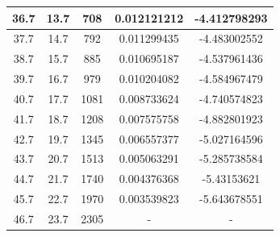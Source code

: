 \documentclass[12pt]{article}
\begin{document}
\begin{flushleft}
\begin{table}[h!]
\begin{tabular}{|c|c|c|c|c|}
            \hline
            36.7	&	13.7	&	708	&	0.012121212	&	-4.412798293	\\
            \hline
            37.7	&	14.7	&	792	&	0.011299435	&	-4.483002552	\\
            \hline
            38.7	&	15.7	&	885	&	0.010695187	&	-4.537961436	\\
            \hline
            39.7	&	16.7	&	979	&	0.010204082	&	-4.584967479	\\
            \hline
            40.7	&	17.7	&	1081	&	0.008733624	&	-4.740574823	\\
            \hline
            41.7	&	18.7	&	1208	&	0.007575758	&	-4.882801923	\\
            \hline
            42.7	&	19.7	&	1345	&	0.006557377	&	-5.027164596	\\
            \hline
            43.7	&	20.7	&	1513	&	0.005063291	&	-5.285738584	\\
            \hline
            44.7	&	21.7	&	1740	&	0.004376368	&	-5.43153621	\\
            \hline
            45.7	&	22.7	&	1970	&	0.003539823	&	-5.643678551	\\
            \hline
            46.7	&	23.7	&	2305	&	-	&	 -	\\
            \hline
        \end{tabular}
    \end{table}

   

    \newpage


\end{flushleft}
\end{document}
